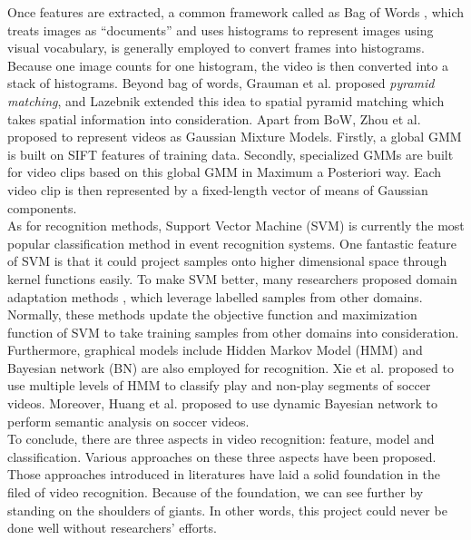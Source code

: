 \noindent Once features are extracted, a common framework called as Bag of Words \cite{sivic2003video}, which treats images as ``documents'' and uses histograms to represent images using visual vocabulary, is generally employed to convert frames into histograms. Because one image counts for one histogram, the video is then converted into a stack of histograms. Beyond bag of words, Grauman et al. \cite{grauman2005pyramid} proposed {\em pyramid matching}, and Lazebnik extended this idea to spatial pyramid matching \cite{lazebnik2006beyond} which takes spatial information into consideration. Apart from BoW, Zhou et al. \cite{zhou2008sift} proposed to represent videos as Gaussian Mixture Models. Firstly, a global GMM is built on SIFT features of training data. Secondly, specialized GMMs are built for video clips based on this global GMM in Maximum a Posteriori way. Each video clip is then represented by a fixed-length vector of means of Gaussian components. \\

\noindent As for recognition methods, Support Vector Machine (SVM) \cite{boser1992training} is currently the most popular classification method in event recognition systems. One fantastic feature of SVM is that it could project samples onto higher dimensional space through kernel functions easily. To make SVM better, many researchers proposed domain adaptation methods \cite{daume2007frustratingly, yang2007cross, duan2009domain, duan2012visual}, which leverage labelled samples from other domains. Normally, these methods update the objective function and maximization function of SVM to take training samples from other domains into consideration. Furthermore, graphical models include Hidden Markov Model (HMM) and Bayesian network (BN) are also employed for recognition. Xie et al. \cite{xie2002structure} proposed to use multiple levels of HMM to classify play and non-play segments of soccer videos. Moreover, Huang et al. \cite{huang2006semantic} proposed to use dynamic Bayesian network to perform semantic analysis on soccer videos. \\

\noindent To conclude, there are three aspects in video recognition: feature, model and classification. Various approaches on these three aspects have been proposed. Those approaches introduced in literatures have laid a solid foundation in the filed of video recognition. Because of the foundation, we can see further by standing on the shoulders of giants. In other words, this project could never be done well without researchers' efforts. 